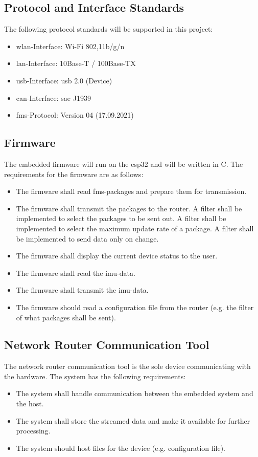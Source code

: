 \newpage
\subsection{Protocol and Interface Standards}
The following protocol standards will be supported in this project:
\begin{itemize}
		\item \acrshort{wlan}-Interface: Wi-Fi 802,11b/g/n
		\item \acrshort{lan}-Interface: 10Base-T / 100Base-TX
		\item \acrshort{usb}-Interface: \acrshort{usb} 2.0 (Device)
		\item \acrshort{can}-Interface: \acrshort{sae} J1939
		\item \acrshort{fms}-Protocol: Version 04 (17.09.2021)
\end{itemize}

\label{sec:firmware}
\subsection{Firmware}
The embedded firmware will run on the \gls{esp32} and will be written in C. The requirements for the firmware are as follows:
\begin{itemize}
    \item The firmware shall read \acrshort{fms}-packages and prepare them for transmission.
    \item The firmware shall transmit the packages to the router.
    \subitem A filter shall be implemented to select the packages to be sent out.
    \subitem A filter shall be implemented to select the maximum update rate of a package.
    \subitem A filter shall be implemented to send data only on change.
    \item The firmware shall display the current device status to the user.
    \item The firmware shall read the \acrshort{imu}-data.
    \item The firmware shall transmit the \acrshort{imu}-data.
    \item The firmware should read a configuration file from the router (e.g. the filter of what packages shall be sent).
\end{itemize}

\subsection{Network Router Communication Tool}
The network router communication tool is the sole device communicating with the hardware. The system has the following requirements:
\begin{itemize}
        \item The system shall handle communication between the embedded system and the host.
        \item The system shall store the streamed data and make it available for further processing.
        \item The system should host files for the device (e.g. configuration file).
\end{itemize}

